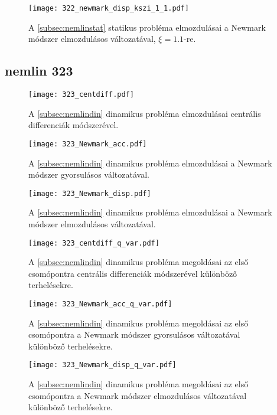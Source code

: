 \begin{figure}[h!]
\centering
\texttt{[image: 322\_newmark\_disp\_kszi\_1\_1.pdf]}
\caption{A \ref{subsec:nemlinstat} statikus probléma elmozdulásai a Newmark módszer elmozdulásos változatával, $\xi = 1.1$-re.}
\label{fig:322_newmark_disp_1_1}
\end{figure}


\subsection{nemlin 323}\label{függ 323}


\begin{figure}[H]
\centering
\texttt{[image: 323\_centdiff.pdf]}
\caption{A \ref{subsec:nemlindin} dinamikus probléma elmozdulásai centrális differenciák módszerével.}
\label{fig:323_centdiff}
\end{figure}

\begin{figure}[H]
\centering
\texttt{[image: 323\_Newmark\_acc.pdf]}
\caption{A \ref{subsec:nemlindin} dinamikus probléma elmozdulásai a Newmark módszer gyorsulásos változatával.}
\label{fig:323_newmark_acc}
\end{figure}

\begin{figure}[H]
\centering
\texttt{[image: 323\_Newmark\_disp.pdf]}
\caption{A \ref{subsec:nemlindin} dinamikus probléma elmozdulásai a Newmark módszer elmozdulásos változatával.}
\label{fig:323_newmark_disp}
\end{figure}


\begin{figure}[H]
\centering
\texttt{[image: 323\_centdiff\_q\_var.pdf]}
\caption{A \ref{subsec:nemlindin} dinamikus probléma megoldásai az első csomópontra  centrális differenciák módszerével különböző terhelésekre.}
\label{fig:323_newmark_disp_q_var_1}
\end{figure}

\begin{figure}[H]
\centering
\texttt{[image: 323\_Newmark\_acc\_q\_var.pdf]}
\caption{A \ref{subsec:nemlindin} dinamikus probléma megoldásai az első csomópontra a Newmark módszer gyorsulásos változatával különböző terhelésekre.}
\label{fig:323_newmark_disp_q_var_1}
\end{figure}

\begin{figure}[H]
\centering
\texttt{[image: 323\_Newmark\_disp\_q\_var.pdf]}
\caption{A \ref{subsec:nemlindin} dinamikus probléma megoldásai az első csomópontra a Newmark módszer elmozdulásos változatával különböző terhelésekre.}
\label{fig:323_newmark_disp_q_var_1}
\end{figure}



